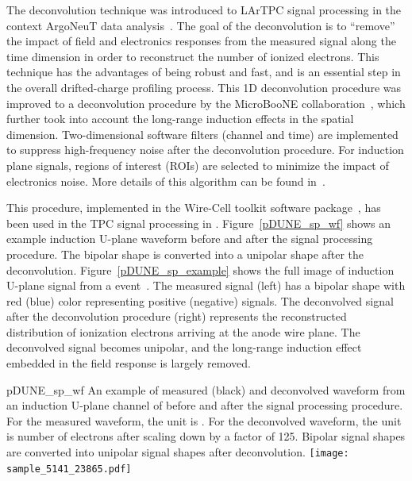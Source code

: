 The deconvolution technique was introduced to LArTPC signal processing in the context ArgoNeuT 
data analysis~\cite{Baller:2017ugz}. The goal of the deconvolution is to ``remove'' the impact of field and 
electronics responses from the measured signal along the time dimension in order to reconstruct the number of ionized
electrons. This technique has the advantages of being robust and fast, and is an essential step in the overall drifted-charge profiling process. This 1D deconvolution procedure was improved to a \twod deconvolution procedure 
by the MicroBooNE collaboration~\cite{Adams:2018dra,Adams:2018gbi}, which further took into account the long-range 
induction effects in the spatial dimension. Two-dimensional software filters (channel and time) are implemented to 
suppress high-frequency noise after the deconvolution procedure. For induction plane signals, regions of interest 
(ROIs) are selected to minimize the impact of electronics noise. More details of this algorithm can be found in~\cite{Adams:2018dra}.

This procedure, implemented in the Wire-Cell toolkit software package~\cite{ref:wire_cell_toolkit},  has been used in the TPC signal processing in . Figure~\ref{pDUNE_sp_wf}
shows an example induction U-plane waveform before and after the signal processing procedure. The bipolar 
shape is converted into a unipolar shape after the \twod deconvolution. Figure~\ref{pDUNE_sp_example}
shows the full \twod image of induction U-plane signal from a  
event~\cite{ref:pdune_signal_processing}. The measured signal (left) has a bipolar shape with red (blue) color 
representing positive (negative) signals. The deconvolved signal after 
the \twod deconvolution procedure (right) represents the reconstructed 
distribution of ionization electrons arriving at the anode wire plane. The 
deconvolved signal becomes unipolar, and the long-range 
induction effect embedded in the field response is largely removed. 

\begin{dunefigure}
{pDUNE_sp_wf}
{An example of measured (black) and deconvolved waveform from an induction U-plane channel of 
before and after the signal processing procedure. For the measured waveform, the unit is . For the deconvolved waveform, the unit is number of electrons after scaling down by a factor of 125.
Bipolar signal shapes are converted into unipolar signal shapes after \twod deconvolution.}
\texttt{[image: sample\_5141\_23865.pdf]}
\end{dunefigure}

